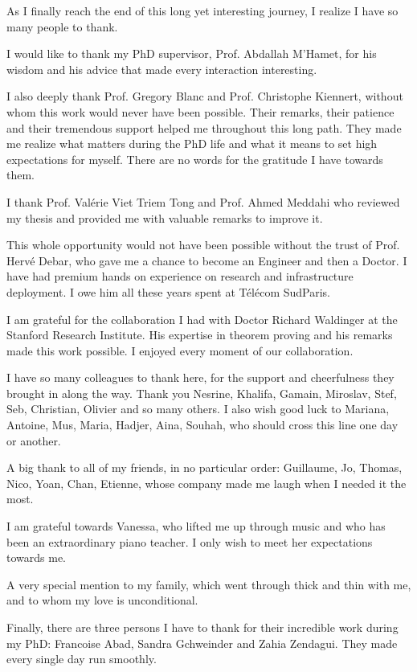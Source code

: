 \documentclass[a4paper, 11pt]{report}
\theoremstyle{definition}
\begin{document}
As I finally reach the end of this long yet interesting journey, I realize I have so many people to thank.

I would like to thank my PhD supervisor, Prof. Abdallah M'Hamet, for his wisdom and his advice that made every interaction interesting.

I also deeply thank Prof. Gregory Blanc and Prof. Christophe Kiennert, without whom this work 
would never have been possible. Their remarks, their patience and their tremendous support helped me throughout this long path. They made me realize what matters during the PhD life and what it means to set high expectations for myself. There are no words for the gratitude I have towards them.

I thank Prof. Val\'erie Viet Triem Tong and Prof. Ahmed Meddahi who reviewed my thesis and provided me with valuable remarks to improve it. 

This whole opportunity would not have been possible without the trust of Prof. Herv\'e Debar, who gave me a chance to become an Engineer and then a Doctor. I have had premium hands on experience on research and infrastructure deployment. I owe him all these years spent at T\'el\'ecom SudParis.

I am grateful for the collaboration I had with Doctor Richard Waldinger at the Stanford Research Institute. His expertise in theorem proving and his remarks made this work possible. I enjoyed every moment of our collaboration.

I have so many colleagues to thank here, for the support and cheerfulness they brought in along the way.
Thank you Nesrine, Khalifa, Gamain, Miroslav, Stef, Seb, Christian, Olivier and so many others. I also wish good luck to Mariana, Antoine, Mus, Maria, Hadjer, Aina, Souhah, who should cross this line one day or another.

A big thank to all of my friends, in no particular order: Guillaume, Jo, Thomas, Nico, Yoan, Chan, Etienne, whose company made me laugh when I needed it the most. 

I am grateful towards Vanessa, who lifted me up through music and who has been an extraordinary piano teacher. I only wish to meet her expectations towards me.

A very special mention to my family, which went through thick and thin with me, and to whom my love is unconditional. 

Finally, there are three persons I have to thank for their incredible work during my PhD: Francoise Abad, Sandra Gchweinder and Zahia Zendagui. They made every single day run smoothly.
\end{document}
